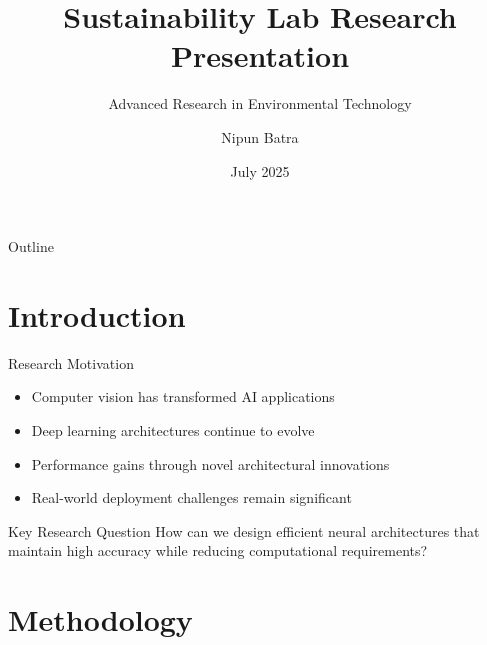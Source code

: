 \documentclass[10pt,aspectratio=169]{beamer}
\title{Sustainability Lab Research Presentation}
\subtitle{Advanced Research in Environmental Technology}
\author{Nipun Batra}
\institute{Sustainability Lab \\ IIT Gandhinagar}
\date{July 2025}
\begin{document}
\begin{frame}
  \titlepage
\end{frame}

\begin{frame}{Outline}
  \tableofcontents
\end{frame}

\section{Introduction}

\begin{frame}{Research Motivation}
\begin{itemize}
\item Computer vision has transformed AI applications
\item Deep learning architectures continue to evolve
\item Performance gains through novel architectural innovations
\item Real-world deployment challenges remain significant
\end{itemize}

\vspace{1em}
\begin{block}{Key Research Question}
How can we design efficient neural architectures that maintain high accuracy while reducing computational requirements?
\end{block}
\end{frame}

\section{Methodology}
\end{document}
